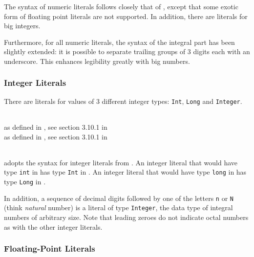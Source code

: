 The syntax of numeric literals follows closely that of \java{}, except that some exotic form of floating point literals are not supported.
In addition, there are literals for big integers.

Furthermore, for all numeric literals, the syntax of the integral part has been slightly extended: it is possible to separate trailing groups of 3 digits each with an underscore. This enhances legibility greatly with big numbers.


\subsubsection{Integer Literals}

There are literals for values of 3 different integer types: \texttt{Int}, \texttt{Long} and \texttt{Integer}.

\begin{flushleft}
  \oder{}  \oder{} \\
 as defined in \java{}, see section 3.10.1 in \cite{langspec3}\\
 as defined in \java{}, see section 3.10.1 in \cite{langspec3}\\
  \\
\end{flushleft}

\frege{} adopts the syntax for integer literals from \java{}. An integer literal that would have type \texttt{int} in \java{} has type \texttt{Int} in \frege{}. An integer literal that would have type \texttt{long} in \java{} has type \texttt{Long} in \frege{}.

In addition, a sequence of decimal digits followed by one of the letters \texttt{n} or \texttt{N} (think \emph{natural} number) is a literal of type \texttt{Integer}, the data type of integral numbers of arbitrary size. Note that leading zeroes do not indicate octal numbers as with the other integer literals.


\subsubsection{Floating-Point Literals}

